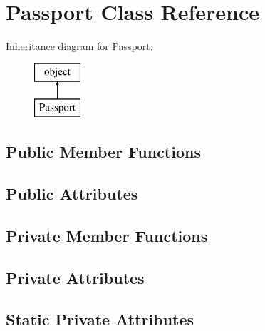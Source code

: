 \hypertarget{classopenbu_1_1passport_1_1_passport}{}\section{Passport Class Reference}
\label{classopenbu_1_1passport_1_1_passport}
Inheritance diagram for Passport\+:\begin{figure}[H]
\begin{center}
\leavevmode
\includegraphics[height=2.000000cm]{classopenbu_1_1passport_1_1_passport}
\end{center}
\end{figure}
\subsection*{Public Member Functions}
\subsection*{Public Attributes}
\subsection*{Private Member Functions}
\subsection*{Private Attributes}
\subsection*{Static Private Attributes}


